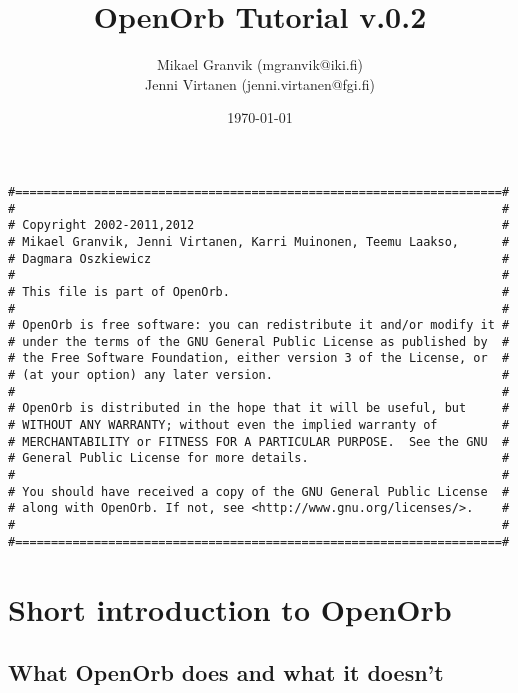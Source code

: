 \documentclass[12pt,english,twoside,a4paper]{report}
\title{OpenOrb Tutorial v.0.2}
\author{Mikael Granvik (mgranvik@iki.fi) \\ Jenni Virtanen (jenni.virtanen@fgi.fi)}
\date{\today}
\begin{document}
\maketitle


\setcounter{page}{1}

\begin{verbatim}
#====================================================================#
#                                                                    #
# Copyright 2002-2011,2012                                           #
# Mikael Granvik, Jenni Virtanen, Karri Muinonen, Teemu Laakso,      #
# Dagmara Oszkiewicz                                                 #
#                                                                    #
# This file is part of OpenOrb.                                      #
#                                                                    #
# OpenOrb is free software: you can redistribute it and/or modify it #
# under the terms of the GNU General Public License as published by  #
# the Free Software Foundation, either version 3 of the License, or  #
# (at your option) any later version.                                #
#                                                                    #
# OpenOrb is distributed in the hope that it will be useful, but     #
# WITHOUT ANY WARRANTY; without even the implied warranty of         #
# MERCHANTABILITY or FITNESS FOR A PARTICULAR PURPOSE.  See the GNU  #
# General Public License for more details.                           #
#                                                                    #
# You should have received a copy of the GNU General Public License  #
# along with OpenOrb. If not, see <http://www.gnu.org/licenses/>.    #
#                                                                    #
#====================================================================#
\end{verbatim}

\pagebreak

\tableofcontents

\pagebreak
{}
\setcounter{page}{1}

\chapter{Short introduction to OpenOrb}

\section{What OpenOrb does and what it doesn't}
\end{document}
